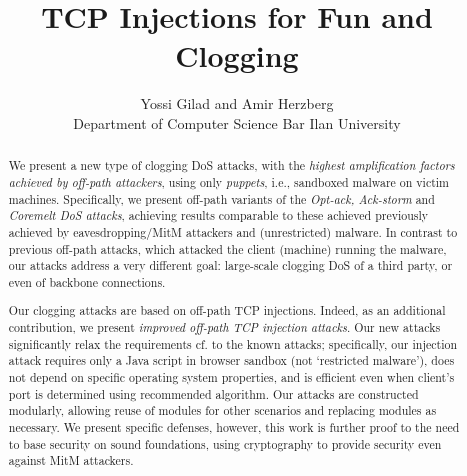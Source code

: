 \documentclass[conference]{IEEEtran}
\begin{document}
\title{TCP Injections for Fun and Clogging}
\author{Yossi Gilad and Amir Herzberg \\ Department of Computer Science Bar Ilan University}


\maketitle

\begin{abstract}
We present a new type of clogging DoS attacks, with the {\em highest amplification factors achieved by off-path attackers}, using only {\em puppets}, i.e., sandboxed malware on victim machines. Specifically, we present off-path variants of the {\em Opt-ack, Ack-storm} and {\em Coremelt DoS attacks}, achieving results comparable to these achieved previously achieved by eavesdropping/MitM attackers and (unrestricted) malware. In contrast to previous off-path attacks, which attacked the client (machine) running the malware, our attacks address a very different goal: large-scale clogging DoS of a third party, or even of backbone connections. 

Our clogging attacks are based on off-path TCP injections. Indeed, as an additional contribution, we present {\em improved off-path TCP injection attacks}. Our new attacks significantly relax the requirements cf. to the known attacks; specifically, our injection attack requires only a Java script in browser sandbox (not `restricted malware'), does not depend on specific operating system properties, and is efficient even when client's port is determined using recommended algorithm. Our attacks are constructed modularly, allowing  reuse of modules for other scenarios and replacing modules as necessary. We present specific defenses, however, this work is further proof to the need to base security on sound foundations, using cryptography to provide security even against MitM attackers.  








\end{abstract}
\end{document}
